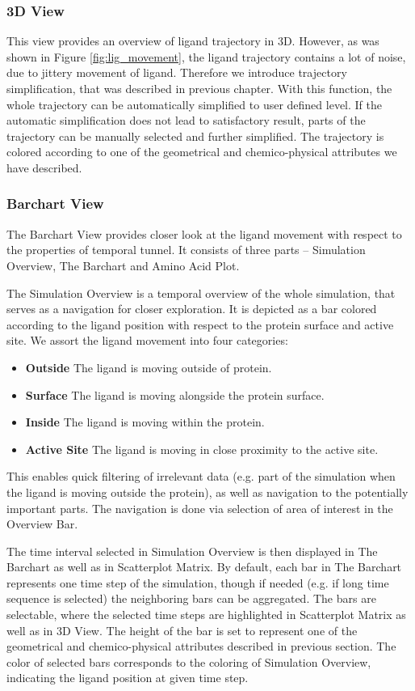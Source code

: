 \documentclass[twocolumn]{bmcart}%
\begin{document}
\subsubsection*{3D View}
This view provides an overview of ligand trajectory in 3D.
However, as was shown in Figure \ref{fig:lig_movement}, the ligand trajectory contains a lot of noise, due to jittery movement of ligand.
Therefore we introduce trajectory simplification, that was described in previous chapter.
With this function, the whole trajectory can be automatically simplified to user defined level.
If the automatic simplification does not lead to satisfactory result, parts of the trajectory can be manually selected and further simplified.
The trajectory is colored according to one of the geometrical and chemico-physical attributes we have described. 

\subsubsection*{Barchart View}
The Barchart View provides closer look at the ligand movement with respect to the properties of temporal tunnel.
It consists of three parts -- Simulation Overview, The Barchart and Amino Acid Plot.

The Simulation Overview is a temporal overview of the whole simulation, that serves as a navigation for closer exploration.
It is depicted as a bar colored according to the ligand position with respect to the protein surface and active site.
We assort the ligand movement into four categories: 
\begin{itemize}
\item \textbf{Outside} The ligand is moving outside of protein.
\item \textbf{Surface} The ligand is moving alongside the protein surface.
\item \textbf{Inside} The ligand is moving within the protein.
\item \textbf{Active Site} The ligand is moving in close proximity to the active site.
\end{itemize}
This enables quick filtering of irrelevant data (e.g. part of the simulation when the ligand is moving outside the protein), as well as navigation to the potentially important parts.
The navigation is done via selection of area of interest in the Overview Bar.

The time interval selected in Simulation Overview is then displayed in The Barchart as well as in Scatterplot Matrix.
By default, each bar in The Barchart represents one time step of the simulation, though if needed (e.g. if long time sequence is selected) the neighboring bars can be aggregated.
The bars are selectable, where the selected time steps are highlighted in Scatterplot Matrix as well as in 3D View.
The height of the bar is set to represent one of the geometrical and chemico-physical attributes described in previous section.
The color of selected bars corresponds to the coloring of Simulation Overview, indicating the ligand position at given time step.
\end{document}
